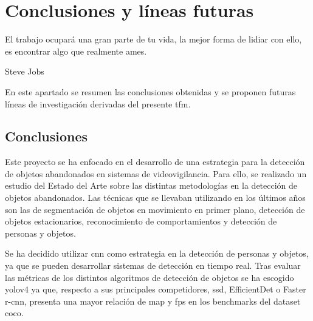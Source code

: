 
\chapter{Conclusiones y líneas futuras}
\label{cha:concl-lineas-futuras}

\begin{FraseCelebre}
  \begin{Frase}
    El trabajo ocupará una gran parte de tu vida, la mejor forma de lidiar con ello, es encontrar algo que realmente ames.
  \end{Frase}
  \begin{Fuente}
    Steve Jobs
  \end{Fuente}
\end{FraseCelebre}

En este apartado se resumen las conclusiones obtenidas y se proponen futuras líneas de investigación derivadas del presente \gls{tfm}.

\section{Conclusiones}
\label{sec:conclusiones-finales}

Este proyecto se ha enfocado en el desarrollo de una estrategia para la detección de objetos abandonados en sistemas de videovigilancia. Para ello, se realizado un estudio del Estado del Arte sobre las distintas metodologías en la detección de objetos abandonados. Las técnicas que se llevaban utilizando en los últimos años son las de segmentación de objetos en movimiento en primer plano, detección de objetos estacionarios, reconocimiento de comportamientos y detección de personas y objetos.

Se ha decidido utilizar \gls{cnn} como estrategia en la detección de personas y objetos, ya que se pueden desarrollar sistemas de detección en tiempo real. Tras evaluar las métricas de los distintos algoritmos de detección de objetos se ha escogido \gls{yolov4} ya que, respecto a sus principales competidores, \gls{ssd}, EfficientDet o Faster \gls{r-cnn}, presenta una mayor relación de \gls{map} y \gls{fps} en los benchmarks del dataset \gls{coco}.

